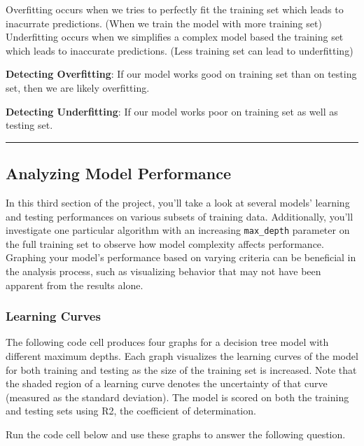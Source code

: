\documentclass[11pt]{article}
\begin{document}
Overfitting occurs when we tries to perfectly fit the training set which
leads to inacurrate predictions. (When we train the model with more
training set) Underfitting occurs when we simplifies a complex model
based the training set which leads to inaccurate predictions. (Less
training set can lead to underfitting)

\textbf{Detecting Overfitting}: If our model works good on training set
than on testing set, then we are likely overfitting.

\textbf{Detecting Underfitting}: If our model works poor on training set
as well as testing set.

    \begin{center}\rule{0.5\linewidth}{\linethickness}\end{center}

\subsection{Analyzing Model
Performance}\label{analyzing-model-performance}

In this third section of the project, you'll take a look at several
models' learning and testing performances on various subsets of training
data. Additionally, you'll investigate one particular algorithm with an
increasing \texttt{\textquotesingle{}max\_depth\textquotesingle{}}
parameter on the full training set to observe how model complexity
affects performance. Graphing your model's performance based on varying
criteria can be beneficial in the analysis process, such as visualizing
behavior that may not have been apparent from the results alone.

    \subsubsection{Learning Curves}\label{learning-curves}

The following code cell produces four graphs for a decision tree model
with different maximum depths. Each graph visualizes the learning curves
of the model for both training and testing as the size of the training
set is increased. Note that the shaded region of a learning curve
denotes the uncertainty of that curve (measured as the standard
deviation). The model is scored on both the training and testing sets
using R2, the coefficient of determination.

Run the code cell below and use these graphs to answer the following
question.
\end{document}

